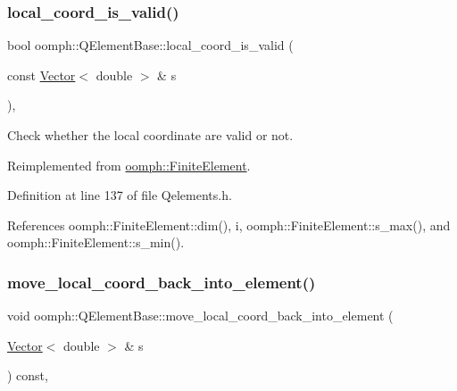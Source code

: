 \subsubsection{\texorpdfstring{local\+\_\+coord\+\_\+is\+\_\+valid()}{local\_coord\_is\_valid()}}
{\footnotesize\ttfamily bool oomph\+::\+Q\+Element\+Base\+::local\+\_\+coord\+\_\+is\+\_\+valid (\begin{DoxyParamCaption}\item[{const \hyperlink{classoomph_1_1Vector}{Vector}$<$ double $>$ \&}]{s }\end{DoxyParamCaption})\hspace{0.3cm}{\ttfamily [inline]}, {\ttfamily [virtual]}}



Check whether the local coordinate are valid or not. 



Reimplemented from \hyperlink{classoomph_1_1FiniteElement_a9ae98c5b577d83303849ff57a9ae81f8}{oomph\+::\+Finite\+Element}.



Definition at line 137 of file Qelements.\+h.



References oomph\+::\+Finite\+Element\+::dim(), i, oomph\+::\+Finite\+Element\+::s\+\_\+max(), and oomph\+::\+Finite\+Element\+::s\+\_\+min().

\mbox{\label{classoomph_1_1QElementBase_a9afe6bb8b04af4c016a78f98de9b22d0}} 
\subsubsection{\texorpdfstring{move\+\_\+local\+\_\+coord\+\_\+back\+\_\+into\+\_\+element()}{move\_local\_coord\_back\_into\_element()}}
{\footnotesize\ttfamily void oomph\+::\+Q\+Element\+Base\+::move\+\_\+local\+\_\+coord\+\_\+back\+\_\+into\+\_\+element (\begin{DoxyParamCaption}\item[{\hyperlink{classoomph_1_1Vector}{Vector}$<$ double $>$ \&}]{s }\end{DoxyParamCaption}) const\hspace{0.3cm}{\ttfamily [inline]}, {\ttfamily [virtual]}}



